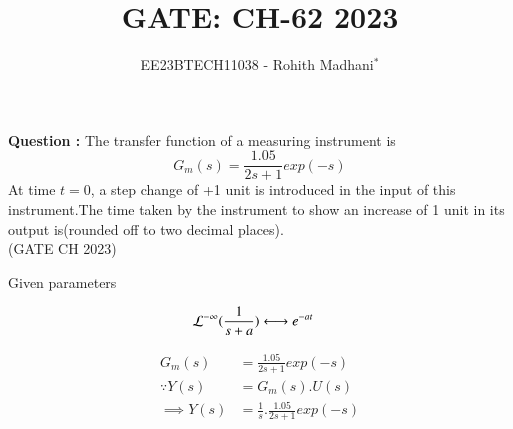 \documentclass[journal,12pt,twocolumn]{IEEEtran}
\theoremstyle{remark}
\begin{document}

\vspace{3cm}

\title{GATE: CH-62 2023}
\author{EE23BTECH11038 - Rohith Madhani$^{*}$%
}
\maketitle
\newpage
\bigskip
\renewcommand{\thefigure}{\theenumi}
\renewcommand{\thetable}{\theenumi}

\textbf{Question :} The transfer function of a measuring instrument is \\
$$G_m(s) = \frac{1.05}{2s+1}exp(-s)$$
At time $t = 0$, a step change of +1 unit is introduced in the input of this instrument.The time taken by the instrument to show an increase of 1 unit in its output is(rounded off to two decimal places). \\ \hfill(GATE CH 2023) \\
\solution

\begin{table}[!h] 
\centering

\caption{Given parameters}
\label{table:gate23ch62}
\end{table}

\begin{align}
    \mathcal{L^{-1}}(\frac{1}{s+a}) &\system{} e^{-at}
\end{align}


\begin{align}
    G_m(s) &= \frac{1.05}{2s+1}exp(-s) \\
    \because Y(s) &= G_m(s).U(s) \\
    \implies Y(s) &= \frac{1}{s}.\frac{1.05}{2s+1}exp(-s)
\end{align}
\end{document}
